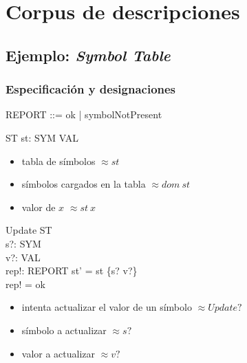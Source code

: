 \chapter{Corpus de descripciones}
\label{ape:corpus}

\section*{Ejemplo: \textit{Symbol Table}}

\subsection*{Especificación y designaciones}

\begin{zed}
 \also
REPORT ::= ok | symbolNotPresent
\end{zed}

\begin{schema}{ST}
st: SYM \pfun VAL
\end{schema}

\begin{itemize}
  \item tabla de símbolos $\approx st$ \\
  \item símbolos cargados en la tabla $\approx dom~st$ \\
  \item valor de $x$ $\approx st~x$ \\
\end{itemize}

\begin{schema}{Update}
\Delta ST \\
s?: SYM \\
v?: VAL \\
rep!: REPORT
\where
st' = st \oplus \{s? \mapsto v?\} \\
rep! = ok
\end{schema}

\begin{itemize}
  \item intenta actualizar el valor de un símbolo $\approx Update?$ \\
  \item símbolo a actualizar $\approx s?$ \\
  \item valor a actualizar  $\approx v?$ \\
\end{itemize}

